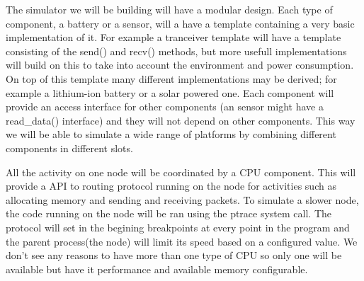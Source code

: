 \label{subsec:architecture}

The simulator we will be building will have a modular design. Each type
of component, a battery or a sensor, will a have a template containing a
very basic implementation of it. For example a tranceiver template will
have a template consisting of the send() and recv() methods, but more
usefull implementations will build on this to take into account the
environment and power consumption. On top of this template many different
implementations may be derived; for example a lithium-ion battery or a solar
powered one. Each component will provide an access interface for other components
(an sensor might have a read_data() interface) and they will not depend on other 
components. This way we will be able to simulate a wide range of platforms by
combining different components in different slots.

All the activity on one node will be coordinated by a CPU component. This will provide
a API to routing protocol running on the node for activities such as allocating memory 
and sending and receiving packets. To simulate a slower node, the code running on the 
node will be ran using the ptrace system call. The protocol will set in the begining
breakpoints at every point in the program and the parent process(the node) will limit
its speed based on a configured value. We don't see any reasons to have more than one
type of CPU so only one will be available but have it performance and available memory
configurable.
